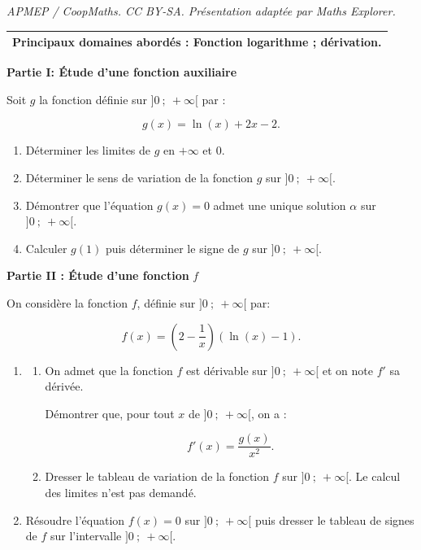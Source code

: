 \documentclass[10pt]{article}
\begin{document}
\noindent\textit{APMEP / CoopMaths. CC BY-SA. Présentation adaptée par Maths Explorer.}\par\medskip
\medskip

\begin{tabularx}{\linewidth}{|X|}\hline
\textbf{Principaux domaines abordés :
Fonction logarithme ; dérivation.}\\ \hline
\end{tabularx}

\bigskip

\textbf{Partie I: Étude d'une fonction auxiliaire}

\medskip

Soit $g$ la fonction définie sur $]0~;~+\infty[$ par :

\[g(x) = \ln(x) + 2x - 2.\]

\smallskip

\begin{enumerate}
\item Déterminer les limites de $g$ en $+\infty$ et $0$.
\item Déterminer le sens de variation de la fonction $g$ sur $]0~;~ +\infty[$.
\item Démontrer que l'équation $g(x) = 0$ admet une unique solution $\alpha$ sur $]0~;~ +\infty[$. 
\item Calculer $g(1)$ puis déterminer le signe de $g$ sur $]0~;~ +\infty[$.
\end{enumerate}

\bigskip

\textbf{Partie II : Étude d'une fonction } \boldmath $f$\unboldmath

\medskip

On considère la fonction $f$, définie sur $]0~;~ +\infty[$ par: 

\[f(x) = \left(2 - \dfrac{1}{x}\right)\left(\ln (x) - 1\right).\]

\begin{enumerate}
\item 
	\begin{enumerate}
		\item On admet que la fonction $f$ est dérivable sur $]0~;~ +\infty[$ et on note $f'$ sa dérivée.

Démontrer que, pour tout $x$ de $]0~;~ +\infty[$, on a : 

\[f'(x) = \dfrac{g(x)}{x^2}.\]

		\item Dresser le tableau de variation de la fonction $f$ sur $]0~;~ +\infty[$. Le calcul des limites n'est pas demandé.
	\end{enumerate}
\item  Résoudre l'équation $f(x) = 0$ sur $]0~;~ +\infty[$ puis dresser le tableau de signes de $f$ sur l'intervalle $]0~;~ +\infty[$.
\end{enumerate}
\end{document}
